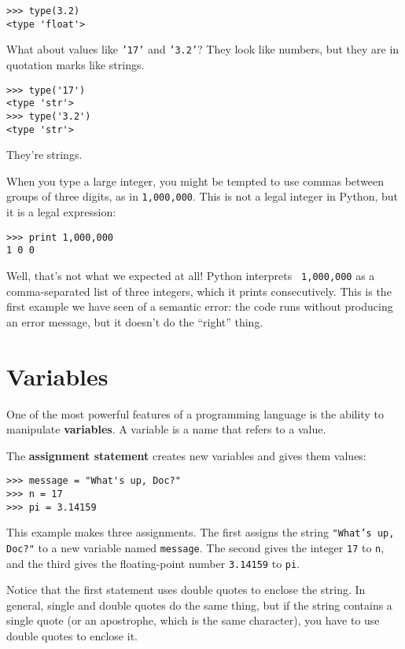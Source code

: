 
\beforeverb
\begin{verbatim}
>>> type(3.2)
<type 'float'>
\end{verbatim}
\afterverb
%
What about values like {\tt '17'} and {\tt '3.2'}?
They look like numbers, but they are in quotation marks like
strings.

\beforeverb
\begin{verbatim}
>>> type('17')
<type 'str'>
>>> type('3.2')
<type 'str'>
\end{verbatim}
\afterverb
%
They're strings.

When you type a large integer, you might be tempted to use commas
between groups of three digits, as in {\tt 1,000,000}.  This is not a
legal integer in Python, but it is a legal expression:

\beforeverb
\begin{verbatim}
>>> print 1,000,000
1 0 0
\end{verbatim}
\afterverb
%
Well, that's not what we expected at all!  Python interprets {\tt
1,000,000} as a comma-separated list of three integers, which it
prints consecutively.  This is the first example we have seen of a
semantic error: the code runs without producing an error message, but
it doesn't do the ``right'' thing.


\section{Variables}

One of the most powerful features of a programming language is the
ability to manipulate {\bf variables}.  A variable is a name that
refers to a value.

The {\bf assignment statement} creates new variables and gives
them values:

\beforeverb
\begin{verbatim}
>>> message = "What's up, Doc?"
>>> n = 17
>>> pi = 3.14159
\end{verbatim}
\afterverb
%
This example makes three assignments.  The first assigns the string
{\tt "What's up, Doc?"} to a new variable named {\tt message}.
The second gives the integer {\tt 17} to {\tt n}, and the third
gives the floating-point number {\tt 3.14159} to {\tt pi}.

Notice that the first statement uses double quotes to enclose the
string.  In general, single and double quotes do the same thing, but
if the string contains a single quote (or an apostrophe, which is
the same character), you have to use double quotes to enclose it.


